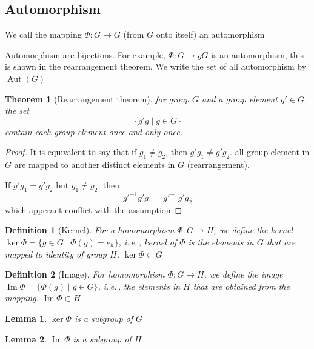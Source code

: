\documentclass{amsart}
\newtheorem{definition}{Definition}
\newtheorem{theorem}{Theorem}
\newtheorem{lemma}{Lemma}
\DeclareMathOperator{\Aut}{Aut}
\DeclareMathOperator{\Image}{Im}
\begin{document}
\subsection*{Automorphism}
    We call the mapping $\Phi\colon G \to G$ (from $G$ onto itself) an automorphism

Automorphism are bijections. For example, $\Phi\colon G \to gG$ is an automorphism, 
this is shown in the rearrangement theorem. We write the set of all automorphism by $\Aut(G)$ 

\vspace{10pt}

\begin{theorem}[Rearrangement theorem]
    for group $G$ and a group element $g'\in G$, the set 
    \[\{g'g \mid g \in G\}\]
    contain each group element once and only once.
\end{theorem}
\begin{proof}
    It is equivalent to say that if $g_1 \neq g_2$, then $g'g_1 \neq g'g_2$. all group element in $G$ are mapped 
    to another distinct elements in $G$ (rearrangement).

    If $g'g_1 = g'g_2$ but $g_1 \neq g_2$, then 
    \[ g'^{-1}g'g_1 = g'^{-1}g'g_2 \] which apperant conflict with the assumption
\end{proof}

\vspace{10pt}

\begin{definition}
    [Kernel] For a homomorphism $\Phi\colon G \to H$, we define the kernel $\ker\Phi = \{g\in G\mid \Phi(g) = e_h \}$, i.\,e.\,,
    kernel of $\Phi$ is the elements in $G$ that are mapped to identity of group $H$. $\ker\Phi \subset G$
\end{definition}

\begin{definition}
    [Image] For homomorphism $\Phi\colon G \to H$, we define the image $\Image\Phi = \{ \Phi(g) \mid g \in G \}$, i.\,e.\,,
    the elements in $H$ that are obtained from the mapping. $\Image\Phi \subset H$
\end{definition}

\begin{lemma}
    $\ker\Phi$ is a subgroup of $G$
\end{lemma}
\begin{lemma}
    $\Image\Phi$ is a subgroup of $H$
\end{lemma}

\vspace{10pt}
\end{document}
